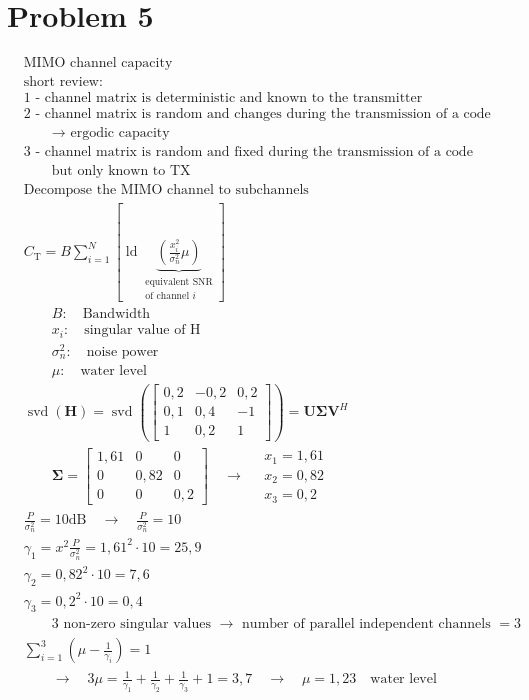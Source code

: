 \documentclass[fleqn]{article}
\DeclareMathOperator{\svd}{svd}
\DeclareMathOperator{\ld}{ld}
\begin{document}
\section*{Problem 5}
\begin{align*}
	&\text{MIMO channel capacity}& \\ 
	&\text{short review:}& \\
	&\text{1 - channel matrix is deterministic and known to the transmitter}& \\
	&\text{2 - channel matrix is random and changes during the transmission of a code word}& \\
	&\qquad\text{$\rightarrow$ ergodic capacity}& \\
	&\text{3 - channel matrix is random and fixed during the transmission of a code word,}& \\ 
	&\qquad\text{but only known to TX}& \\
	&\text{Decompose the MIMO channel to subchannels}& \\
	&C_{\mathrm{T}}=B\sum_{i=1}^{N}\left[\ld\underbrace{\left(\frac{x_{i}^{2}}{\sigma_{n}^{2}}\mu\right)}_{\substack{\text{equivalent SNR} \\ \text{of channel $i$}}}\right]& \\
	&\qquad B:\quad\text{Bandwidth}& \\
	&\qquad x_{i}:\quad\text{singular value of H}& \\
	&\qquad\sigma_{n}^{2}:\quad\text{noise power}& \\
	&\qquad\mu :\quad\text{water level}& \\
	&\svd\left(\mathbf{H}\right)=\svd\left(
	\begin{bmatrix}
	0,2 & -0,2 & 0,2 \\
	0,1 & 0,4 & -1 \\
	1 & 0,2 & 1
	\end{bmatrix}\right)=\mathbf{U\Sigma V}^{H}& \\
	&\qquad\mathbf{\Sigma}=
	\begin{bmatrix}
	1,61 & 0 & 0 \\
	0 & 0,82 & 0 \\
	0 & 0 & 0,2
	\end{bmatrix}\quad\rightarrow\quad
	\begin{matrix}
	x_{1} = 1,61 \\
	x_{2} = 0,82 \\
	x_{3} = 0,2
	\end{matrix}& \\
	&\frac{P}{\sigma_{n}^{2}}=10\mathrm{dB}\quad\rightarrow\quad\frac{P}{\sigma_{n}^{2}}=10& \\
	&\gamma_{1}=x^{2}\frac{P}{\sigma_{n}^{2}}=1,61^{2}\cdot 10=25,9& \\
	&\gamma_{2}=0,82^{2}\cdot 10=7,6& \\
	&\gamma_{3}=0,2^{2}\cdot 10=0,4& \\
	&\qquad\text{3 non-zero singular values $\rightarrow$ number of parallel independent channels $=3$}& \\
	&\sum_{i=1}^{3}\left(\mu-\frac{1}{\gamma_{i}}\right)=1& \\
	&\qquad\rightarrow\quad 3\mu=\frac{1}{\gamma_{1}}+\frac{1}{\gamma_{2}}+\frac{1}{\gamma_{3}}+1=3,7\quad\rightarrow\quad\mu=1,23\quad\text{water level}&
\end{align*}
\end{document}
